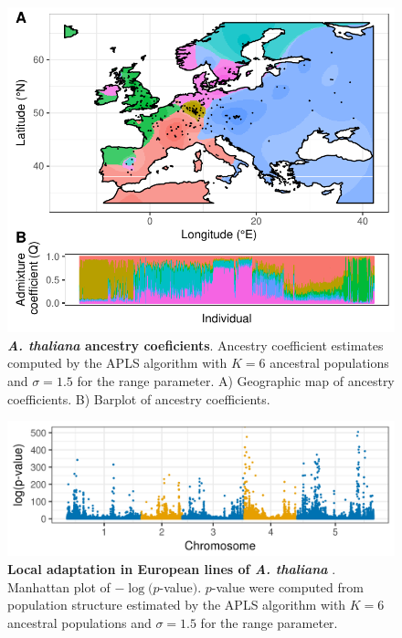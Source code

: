 \clearpage 
\newpage

\begin{figure}
  \centering
  \includegraphics{./Figures/map.pdf}
  \caption{{\bf {\it A. thaliana} ancestry coeficients}. Ancestry coefficient
    estimates computed by the APLS algorithm with $K=6$ ancestral populations
    and $\sigma = 1.5$ for the range parameter. A) Geographic map of ancestry
    coefficients. B) Barplot of ancestry coefficients.}
  \label{fig:map}
\end{figure}

\clearpage 
\newpage

\begin{figure}
  \centering
  \includegraphics[width=0.60\paperwidth]{./Figures/manhattanplot.png}
  \caption{{\bf Local adaptation in European lines of \bf {\it A. thaliana} }.
    Manhattan plot of $-\log(p$\rm -value$)$. $p$-value were computed from
    population structure estimated by the APLS algorithm with $K=6$ ancestral
    populations and $\sigma = 1.5$ for the range parameter.}
  \label{fig:man}
\end{figure}

